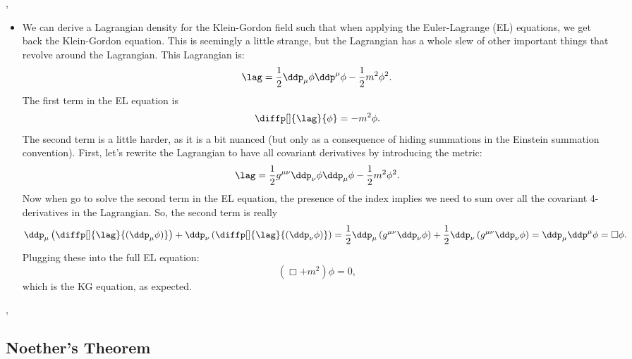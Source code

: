 \sep


\begin{itemize}
    \item We can derive a Lagrangian density for the Klein-Gordon field such that when applying the Euler-Lagrange (EL) equations, we get back the Klein-Gordon equation. This is seemingly a little strange, but the Lagrangian has a whole slew of other important things that revolve around the Lagrangian. This Lagrangian is:
        \begin{equation}
            \lag = \frac{1}{2}\ddp_{\mu}\phi\ddp^{\mu}\phi - \frac{1}{2}m^2\phi^2.
        \end{equation}
        The first term in the EL equation is
        \begin{equation*}
            \diffp[]{\lag}{\phi} = -m^2\phi.
        \end{equation*}
        The second term is a little harder, as it is a bit nuanced (but only as a consequence of hiding summations in the Einstein summation convention). First, let's rewrite the Lagrangian to have all covariant derivatives by introducing the metric:
        \begin{equation*}
            \lag = \frac{1}{2} g^{\mu\nu} \ddp_{\nu} \phi \ddp_{\mu} \phi - \frac{1}{2}m^2\phi^2.
        \end{equation*}
        Now when go to solve the second term in the EL equation, the presence of the index implies we need to sum over all the covariant 4-derivatives in the Lagrangian. So, the second term is really
        \begin{equation*}
            \ddp_{\mu}\left(\diffp[]{\lag}{(\ddp_{\mu}\phi)}\right) + \ddp_{\nu}\left(\diffp[]{\lag}{(\ddp_{\nu}\phi)}\right) = \frac{1}{2}\ddp_{\mu}\left(g^{\mu\nu}\ddp_{\nu}\phi\right) + \frac{1}{2}\ddp_{\nu} \left(g^{\mu\nu}\ddp_{\nu}\phi\right) = \ddp_{\mu}\ddp^{\mu}\phi = \Box \phi.
        \end{equation*}
        Plugging these into the full EL equation:
        \begin{equation*}
            \boxed{\left(\Box + m^2\right)\phi = 0,}
        \end{equation*}
        which is the KG equation, as expected.
\end{itemize}





\sep



\subsection{Noether's Theorem}

